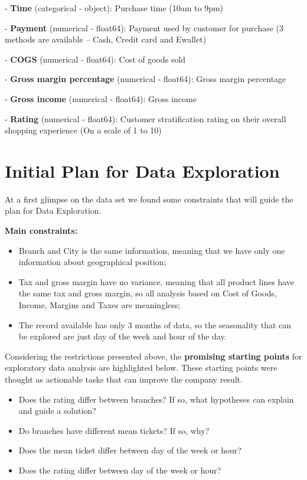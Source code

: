 \documentclass[11pt, a4]{article}
\begin{document}
- \textbf{Time} (categorical - object): Purchase time (10am to 9pm)

- \textbf{Payment} (numerical - float64): Payment used by customer for purchase (3 methods are available – Cash, Credit card and Ewallet)

- \textbf{COGS} (numerical - float64): Cost of goods sold

- \textbf{Gross margin percentage} (numerical - float64): Gross margin percentage

- \textbf{Gross income} (numerical - float64): Gross income

- \textbf{Rating} (numerical - float64): Customer stratification rating on their overall shopping experience (On a scale of 1 to 10)




\section*{Initial Plan for Data Exploration}

At a first glimpse on the data set we found some constraints that will guide the plan for Data Exploration.

\textbf{Main constraints:}
\begin{itemize}
\item Branch and City is the same information, meaning that we have only one information about geographical position;
\item Tax and gross margin have no variance, meaning that all product lines have the same tax and gross margin, so all analysis based on Cost of Goods, Income, Margins and Taxes are meaningless;
\item The record available has only 3 months of data, so the seasonality that can be explored are just day of the week and hour of the day.
\end{itemize}

Considering the restrictions presented above, the \textbf{promising starting points} for exploratory data analysis are highlighted below. These starting points were thought as actionable tasks that can improve the company result.
\begin{itemize}
\item Does the rating differ between branches? If so, what hypotheses can explain and guide a solution?
\item Do branches have different mean tickets? If so, why?
\item Does the mean ticket differ between day of the week or hour?
\item Does the rating differ between day of the week or hour?
\end{itemize}
\end{document}

